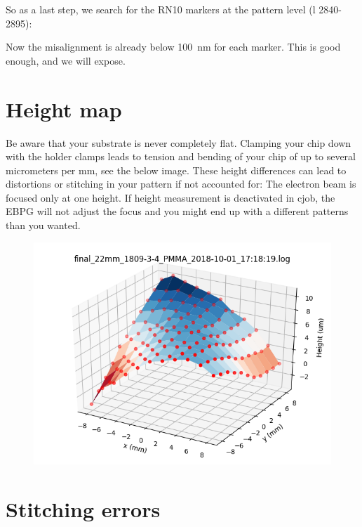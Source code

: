 So as a last step, we search for the RN10 markers at the pattern level (l 2840-2895):




Now the misalignment is already below \SI{100}{\nano\meter} for each marker. This is good enough, and we will expose.


\section{Height map}

Be aware that your substrate is never completely flat. Clamping your chip down with the holder clamps leads to tension and bending of your chip of up to several micrometers per mm, see the below image. These height differences can lead to distortions or stitching in your pattern if not accounted for: The electron beam is focused only at one height. If height measurement is deactivated in cjob, the EBPG will not adjust the focus and you might end up with a different patterns than you wanted.

\begin{figure}
	\centering
	\includegraphics[width=0.5\linewidth]{appendix/figs/heightmap}
	\caption{}
	\label{fig:heightmap}
\end{figure}


\section{Stitching errors}

